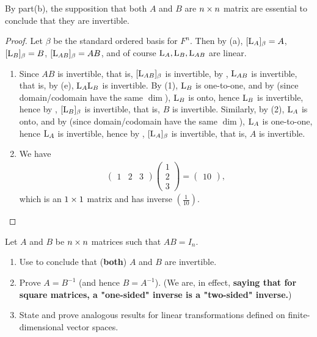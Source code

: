 \begin{note}
By part(b), the supposition that both \(A\) and \(B\) are \(n \times n\) matrix are essential to conclude that they are invertible.
\end{note}

\begin{proof}
Let \(\beta\) be the standard ordered basis for \(F^n\).
Then by (a), \([\mathrm{L}_A]_{\beta} = A\), \([\mathrm{L}_B]_{\beta} = B\), \([\mathrm{L}_{AB}]_{\beta} = AB\),
and of course \(\mathrm{L}_A, \mathrm{L}_B, \mathrm{L}_{AB}\) are linear.
\begin{enumerate}
\item Since \(AB\) is invertible, that is, \([\mathrm{L}_{AB}]_{\beta}\) is invertible, by , \(\mathrm{L}_{AB}\) is invertible, that is, by (e), \(\mathrm{L}_A \mathrm{L}_B\) is invertible.
By (1), \(\mathrm{L}_B\) is one-to-one, and by  (since domain/codomain have the same \(\dim\)), \(\mathrm{L}_B\) is onto,
hence \(\mathrm{L}_B\) is invertible, hence by , \([\mathrm{L}_B]_{\beta}\) is invertible, that is, \(B\) is invertible.
Similarly, by (2), \(\mathrm{L}_A\) is onto, and by  (since domain/codomain have the same \(\dim\)), \(\mathrm{L}_A\) is one-to-one,
hence \(\mathrm{L}_A\) is invertible, hence by , \([\mathrm{L}_A]_{\beta}\) is invertible, that is, \(A\) is invertible.

\item
We have
\begin{align*}
    \begin{pmatrix} 1 & 2 & 3 \end{pmatrix}
    \begin{pmatrix} 1 \\ 2 \\ 3 \end{pmatrix}
    = \begin{pmatrix} 10 \end{pmatrix},
\end{align*}
which is an \(1 \times 1\) matrix and has inverse \(( \frac{1}{10} )\).
\end{enumerate}
\end{proof}

\begin{exercise} \label{exercise 2.4.10}
Let \(A\) and \(B\) be \(n \times n\) matrices such that \(AB = I_n\).
\begin{enumerate}
\item Use  to conclude that (\textbf{both}) \(A\) and \(B\) are invertible.
\item Prove \(A = B^{-1}\) (and hence \(B = A^{-1}\)).
    (We are, in effect, \textbf{saying that for square matrices, a "one-sided" inverse is a "two-sided" inverse.})
\item State and prove analogous results for linear transformations defined on finite-dimensional vector spaces.
\end{enumerate}
\end{exercise}

